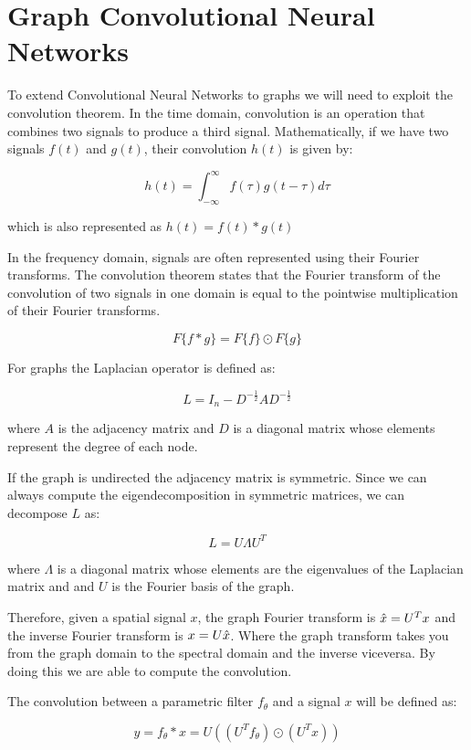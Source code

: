 \newpage
\section{Graph Convolutional Neural Networks}

To extend Convolutional Neural Networks to graphs we will need to exploit the convolution theorem. In the time domain, convolution is an operation that combines two signals to produce a third signal. Mathematically, if we have two signals $f(t)$ and $g(t)$, their convolution $h(t)$ is given by:

$$ h(t) = \int_{-\infty}^{\infty} f(\tau) g(t - \tau) d\tau  $$

which is also represented as $h(t) = f(t)*g(t)$

\noindent In the frequency domain, signals are often represented using their Fourier transforms. The convolution theorem states that the Fourier transform of the convolution of two signals in one domain is equal to the pointwise multiplication of their Fourier transforms. 

$$ F\{f*g\} = F\{f\} \odot F\{g\} $$

\noindent For graphs the Laplacian operator is defined as:

$$  L = I_n - D^{-\frac{1}{2}} A D^{-\frac{1}{2}}$$

\noindent where $A$ is the adjacency matrix and $D$ is a diagonal matrix whose elements represent the degree of each node.

\noindent If the graph is undirected the adjacency matrix is symmetric. Since we can always compute the eigendecomposition in symmetric matrices, we can decompose $L$ as:

$$L = U  \Lambda U^T $$

where $\Lambda$ is a diagonal matrix whose elements are the eigenvalues of the Laplacian matrix and and $U$ is the Fourier basis of the graph.

\noindent Therefore, given a spatial signal $x$, the graph Fourier transform is $\Hat{x} = U^T x$ and the inverse Fourier transform is $x= U \Hat{x}$. Where the graph transform takes you from the graph domain to the spectral domain and the inverse viceversa. By doing this we are able to compute the convolution.

\noindent The convolution between a parametric filter $f_{\theta}$ and a signal $x$ will be defined as:

$$ y = f_{\theta} * x = U \left( \left( U^T f_{\theta} \right) \odot \left( U^T x \right)   \right) $$

